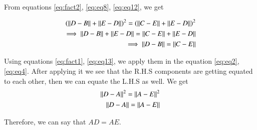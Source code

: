 \documentclass[journal,12pt,twocolumn]{IEEEtran}
\begin{document}
	From equations \eqref{eq:fact2}, \eqref{eq:eq8}, \eqref{eq:eq12}, we get
	
	\begin{align}\label{eq:eq13}
		\left(\left\lVert D-B\right\rVert + \left\lVert E-D\right\rVert\right)^{2} = \left(\left\lVert C-E\right\rVert + \left\lVert E-D\right\rVert\right)^{2} \nonumber \\
		\implies \left\lVert D-B\right\rVert + \left\lVert E-D\right\rVert = \left\lVert C-E\right\rVert + \left\lVert E-D\right\rVert \nonumber \\
		\implies \left\lVert D-B\right\rVert = \left\lVert C-E\right\rVert
	\end{align}

	Using equations \eqref{eq:fact1}, \eqref{eq:eq13}, we apply them in the equation \eqref{eq:eq2}, \eqref{eq:eq4}. After applying it we see that the R.H.S components are getting equated to each other, then we can equate the L.H.S as well. We get 
	\begin{align}\label{eq:eq15}
		\left\lVert D-A\right\rVert^{2} = \left\lVert A-E\right\rVert^{2} \nonumber \\
		\left\lVert D-A\right\rVert = \left\lVert A-E\right\rVert
	\end{align}
	
	Therefore, we can say that $AD = AE$.
	
\end{document}
